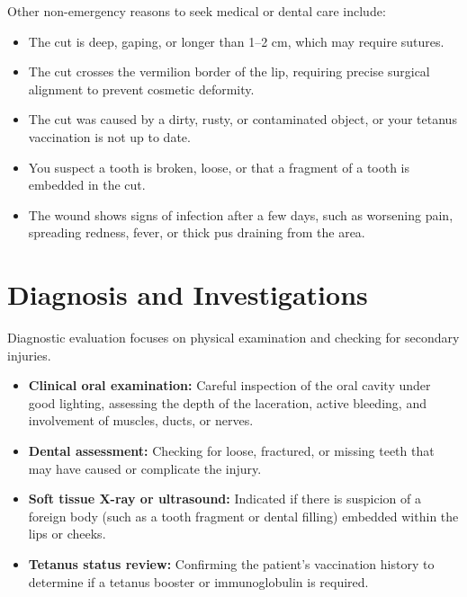 Other non-emergency reasons to seek medical or dental care include:
\begin{itemize}
    \item The cut is deep, gaping, or longer than 1--2 cm, which may require sutures.
    \item The cut crosses the vermilion border of the lip, requiring precise surgical alignment to prevent cosmetic deformity.
    \item The cut was caused by a dirty, rusty, or contaminated object, or your tetanus vaccination is not up to date.
    \item You suspect a tooth is broken, loose, or that a fragment of a tooth is embedded in the cut.
    \item The wound shows signs of infection after a few days, such as worsening pain, spreading redness, fever, or thick pus draining from the area.
\end{itemize}

\section*{Diagnosis and Investigations}
Diagnostic evaluation focuses on physical examination and checking for secondary injuries.
\begin{itemize}
    \item \textbf{Clinical oral examination:} Careful inspection of the oral cavity under good lighting, assessing the depth of the laceration, active bleeding, and involvement of muscles, ducts, or nerves.
    \item \textbf{Dental assessment:} Checking for loose, fractured, or missing teeth that may have caused or complicate the injury.
    \item \textbf{Soft tissue X-ray or ultrasound:} Indicated if there is suspicion of a foreign body (such as a tooth fragment or dental filling) embedded within the lips or cheeks.
    \item \textbf{Tetanus status review:} Confirming the patient's vaccination history to determine if a tetanus booster or immunoglobulin is required.
\end{itemize}

